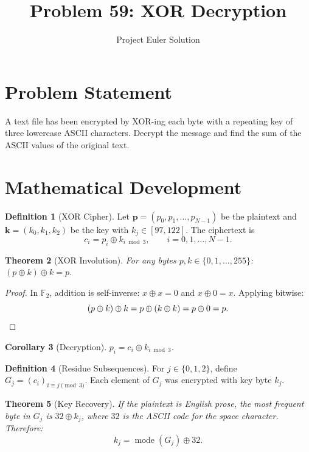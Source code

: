 \documentclass[12pt,a4paper]{article}
\title{Problem 59: XOR Decryption}
\author{Project Euler Solution}
\date{}
\newtheorem{theorem}{Theorem}
\newtheorem{corollary}[theorem]{Corollary}
\theoremstyle{definition}
\newtheorem{definition}[theorem]{Definition}
\theoremstyle{remark}
\begin{document}
\maketitle

\section{Problem Statement}
A text file has been encrypted by XOR-ing each byte with a repeating key of three lowercase ASCII characters. Decrypt the message and find the sum of the ASCII values of the original text.

\section{Mathematical Development}

\begin{definition}[XOR Cipher]
Let $\mathbf{p} = (p_0, p_1, \ldots, p_{N-1})$ be the plaintext and $\mathbf{k} = (k_0, k_1, k_2)$ be the key with $k_j \in [97, 122]$. The ciphertext is
\[
c_i = p_i \oplus k_{i \bmod 3}, \qquad i = 0, 1, \ldots, N-1.
\]
\end{definition}

\begin{theorem}[XOR Involution]
For any bytes $p, k \in \{0, 1, \ldots, 255\}$: $(p \oplus k) \oplus k = p$.
\end{theorem}

\begin{proof}
In $\mathbb{F}_2$, addition is self-inverse: $x \oplus x = 0$ and $x \oplus 0 = x$. Applying bitwise:
\[
(p \oplus k) \oplus k = p \oplus (k \oplus k) = p \oplus 0 = p. \qedhere
\]
\end{proof}

\begin{corollary}[Decryption]
$p_i = c_i \oplus k_{i \bmod 3}$.
\end{corollary}

\begin{definition}[Residue Subsequences]
For $j \in \{0, 1, 2\}$, define $G_j = (c_i)_{i \equiv j \pmod{3}}$. Each element of $G_j$ was encrypted with key byte $k_j$.
\end{definition}

\begin{theorem}[Key Recovery]
If the plaintext is English prose, the most frequent byte in $G_j$ is $32 \oplus k_j$, where $32$ is the ASCII code for the space character. Therefore:
\[
k_j = \operatorname{mode}(G_j) \oplus 32.
\]
\end{theorem}
\end{document}
